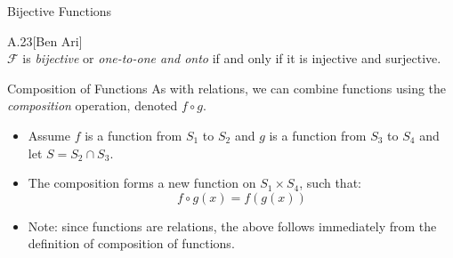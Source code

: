 \documentclass[style=sailor,size=12pt]{powerdot}
\begin{document}
\begin{slide}[bm=,toc=]{Bijective Functions}
\begin{defn}{A.23}[Ben Ari]~\\
$\mathcal{F}$ is \emph{bijective} or \emph{one-to-one and onto} if and only if
it is injective and surjective.
\end{defn}
\end{slide}

\begin{slide}[bm=,toc=]{Composition of Functions}
As with relations, we can combine functions using the \emph{composition} operation, 
denoted $f \circ g$.
\begin{itemize}
\item Assume $f$ is a function from $S_1$ to $S_2$ and $g$ is a function from 
$S_3$ to $S_4$ and let $S = S_2 \cap S_3$.
\item The composition forms a new function on $S_1 \times S_4$, such that:
\[
  f \circ g(x) = f(g(x))
\]
\vspace{-5mm}
\item Note: since functions are relations, the above follows immediately from
the definition of composition of functions.
\end{itemize}

\end{slide}
\end{document}
